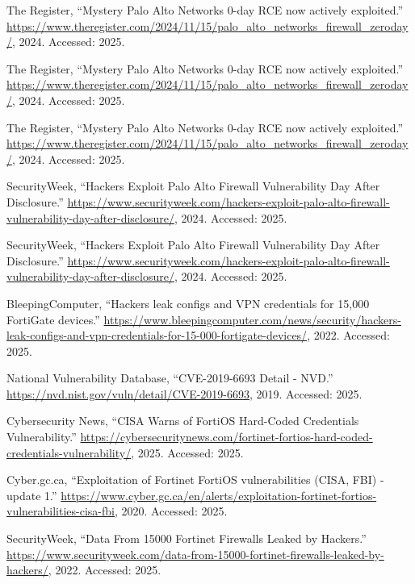 \documentclass[12pt]{article}
\begin{document}
\begin{thebibliography}{10}
{The Register}, ``{Mystery Palo Alto Networks 0-day RCE now actively
  exploited}.''
  \url{https://www.theregister.com/2024/11/15/palo_alto_networks_firewall_zeroday/},
  2024.
\newblock Accessed: 2025.

{The Register}, ``{Mystery Palo Alto Networks 0-day RCE now actively
  exploited}.''
  \url{https://www.theregister.com/2024/11/15/palo_alto_networks_firewall_zeroday/},
  2024.
\newblock Accessed: 2025.

{The Register}, ``{Mystery Palo Alto Networks 0-day RCE now actively
  exploited}.''
  \url{https://www.theregister.com/2024/11/15/palo_alto_networks_firewall_zeroday/},
  2024.
\newblock Accessed: 2025.

{SecurityWeek}, ``{Hackers Exploit Palo Alto Firewall Vulnerability Day After
  Disclosure}.''
  \url{https://www.securityweek.com/hackers-exploit-palo-alto-firewall-vulnerability-day-after-disclosure/},
  2024.
\newblock Accessed: 2025.

{SecurityWeek}, ``{Hackers Exploit Palo Alto Firewall Vulnerability Day After
  Disclosure}.''
  \url{https://www.securityweek.com/hackers-exploit-palo-alto-firewall-vulnerability-day-after-disclosure/},
  2024.
\newblock Accessed: 2025.

{BleepingComputer}, ``{Hackers leak configs and VPN credentials for 15,000
  FortiGate devices}.''
  \url{https://www.bleepingcomputer.com/news/security/hackers-leak-configs-and-vpn-credentials-for-15-000-fortigate-devices/},
  2022.
\newblock Accessed: 2025.

{National Vulnerability Database}, ``{CVE-2019-6693 Detail - NVD}.''
  \url{https://nvd.nist.gov/vuln/detail/CVE-2019-6693}, 2019.
\newblock Accessed: 2025.

{Cybersecurity News}, ``{CISA Warns of FortiOS Hard-Coded Credentials
  Vulnerability}.''
  \url{https://cybersecuritynews.com/fortinet-fortios-hard-coded-credentials-vulnerability/},
  2025.
\newblock Accessed: 2025.

{Cyber.gc.ca}, ``{Exploitation of Fortinet FortiOS vulnerabilities (CISA, FBI)
  - update 1}.''
  \url{https://www.cyber.gc.ca/en/alerts/exploitation-fortinet-fortios-vulnerabilities-cisa-fbi},
  2020.
\newblock Accessed: 2025.

{SecurityWeek}, ``{Data From 15000 Fortinet Firewalls Leaked by Hackers}.''
  \url{https://www.securityweek.com/data-from-15000-fortinet-firewalls-leaked-by-hackers/},
  2022.
\newblock Accessed: 2025.


\end{thebibliography}
\end{document}
